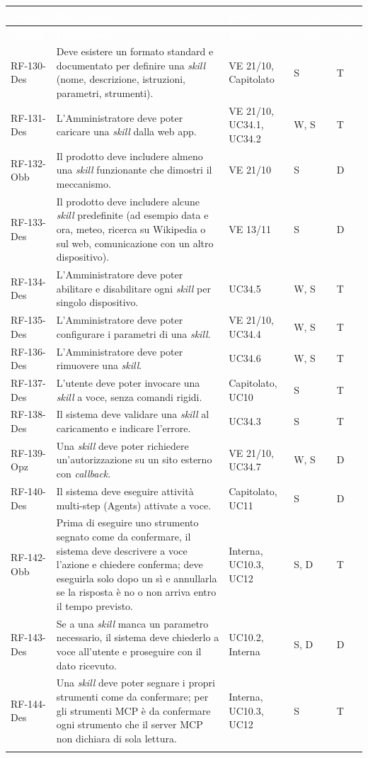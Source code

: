 \documentclass[12pt,a4paper]{article}
\newcommand{\thc}[1]{\textcolor{white}{\textbf{#1}}}
\newcommand{\rl}{\\ \arrayrulecolor{bfline}\hline}
\begin{document}
\begin{longtable}{>{\raggedright\arraybackslash}p{}>{\raggedright\arraybackslash}p{}>{\raggedright\arraybackslash}p{}>{\raggedright\arraybackslash}p{}>{\centering\arraybackslash}p{}}
\rowcolor{bfblue}\thc{Codice} & \thc{Descrizione} & \thc{Fonti} & \thc{Comp.} & \thc{Ver.} \\
\endfirsthead
\rowcolor{bfblue}\thc{Codice} & \thc{Descrizione} & \thc{Fonti} & \thc{Comp.} & \thc{Ver.} \\
\endhead
RF-130-Des & Deve esistere un formato standard e documentato per definire una \emph{skill} (nome, descrizione, istruzioni, parametri, strumenti). & VE 21/10, Capitolato & S & T \rl
RF-131-Des & L'Amministratore deve poter caricare una \emph{skill} dalla web app. & VE 21/10, UC34.1, UC34.2 & W, S & T \rl
RF-132-Obb & Il prodotto deve includere almeno una \emph{skill} funzionante che dimostri il meccanismo. & VE 21/10 & S & D \rl
RF-133-Des & Il prodotto deve includere alcune \emph{skill} predefinite (ad esempio data e ora, meteo, ricerca su Wikipedia o sul web, comunicazione con un altro dispositivo). & VE 13/11 & S & D \rl
RF-134-Des & L'Amministratore deve poter abilitare e disabilitare ogni \emph{skill} per singolo dispositivo. & UC34.5 & W, S & T \rl
RF-135-Des & L'Amministratore deve poter configurare i parametri di una \emph{skill}. & VE 21/10, UC34.4 & W, S & T \rl
RF-136-Des & L'Amministratore deve poter rimuovere una \emph{skill}. & UC34.6 & W, S & T \rl
RF-137-Des & L'utente deve poter invocare una \emph{skill} a voce, senza comandi rigidi. & Capitolato, UC10 & S & T \rl
RF-138-Des & Il sistema deve validare una \emph{skill} al caricamento e indicare l'errore. & UC34.3 & S & T \rl
RF-139-Opz & Una \emph{skill} deve poter richiedere un'autorizzazione su un sito esterno con \emph{callback}. & VE 21/10, UC34.7 & W, S & D \rl
RF-140-Des & Il sistema deve eseguire attività multi-step (Agents) attivate a voce. & Capitolato, UC11 & S & D \rl
RF-142-Obb & Prima di eseguire uno strumento segnato come da confermare, il sistema deve descrivere a voce l'azione e chiedere conferma; deve eseguirla solo dopo un sì e annullarla se la risposta è no o non arriva entro il tempo previsto. & Interna, UC10.3, UC12 & S, D & T \rl
RF-143-Des & Se a una \emph{skill} manca un parametro necessario, il sistema deve chiederlo a voce all'utente e proseguire con il dato ricevuto. & UC10.2, Interna & S, D & D \rl
RF-144-Des & Una \emph{skill} deve poter segnare i propri strumenti come da confermare; per gli strumenti MCP è da confermare ogni strumento che il server MCP non dichiara di sola lettura. & Interna, UC10.3, UC12 & S & T \rl
\end{longtable}
\end{document}
